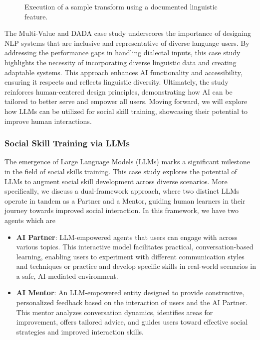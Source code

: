 \documentclass[
  letterpaper,
  numbers=noenddot,
  DIV=11]{scrreprt}
\theoremstyle{definition}
\theoremstyle{plain}
\theoremstyle{plain}
\theoremstyle{remark}
\begin{document}
\begin{figure}


\caption{\label{fig-dada_performance}Execution of a sample transform
using a documented linguistic feature.}

\end{figure}%

The Multi-Value and DADA case study underscores the importance of
designing NLP systems that are inclusive and representative of diverse
language users. By addressing the performance gaps in handling dialectal
inputs, this case study highlights the necessity of incorporating
diverse linguistic data and creating adaptable systems. This approach
enhances AI functionality and accessibility, ensuring it respects and
reflects linguistic diversity. Ultimately, the study reinforces
human-centered design principles, demonstrating how AI can be tailored
to better serve and empower all users. Moving forward, we will explore
how LLMs can be utilized for social skill training, showcasing their
potential to improve human interactions.

\subsubsection{Social Skill Training via
LLMs}\label{social-skill-training-via-llms}

The emergence of Large Language Models (LLMs) marks a significant
milestone in the field of social skills training. This case study
explores the potential of LLMs to augment social skill development
across diverse scenarios. More specifically, we discuss a dual-framework
approach, where two distinct LLMs operate in tandem as a Partner and a
Mentor, guiding human learners in their journey towards improved social
interaction. In this framework, we have two agents which are

\begin{itemize}
\item
  \textbf{AI Partner}: LLM-empowered agents that users can engage with
  across various topics. This interactive model facilitates practical,
  conversation-based learning, enabling users to experiment with
  different communication styles and techniques or practice and develop
  specific skills in real-world scenarios in a safe, AI-mediated
  environment.
\item
  \textbf{AI Mentor}: An LLM-empowered entity designed to provide
  constructive, personalized feedback based on the interaction of users
  and the AI Partner. This mentor analyzes conversation dynamics,
  identifies areas for improvement, offers tailored advice, and guides
  users toward effective social strategies and improved interaction
  skills.
\end{itemize}
\end{document}
